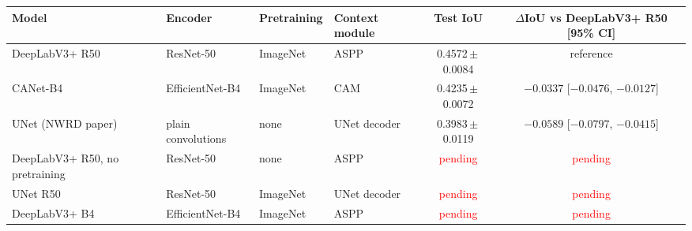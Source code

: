\begin{tabular}{llllcc}
\toprule
Model & Encoder & Pretraining & Context module & Test IoU & $\Delta$IoU vs DeepLabV3+ R50 [95\% CI] \\
\midrule
DeepLabV3+ R50 & ResNet-50 & ImageNet & ASPP & 0.4572\,$\pm$\,0.0084 & reference \\
CANet-B4 & EfficientNet-B4 & ImageNet & CAM & 0.4235\,$\pm$\,0.0072 & $-0.0337$ [$-0.0476$, $-0.0127$] \\
UNet (NWRD paper) & plain convolutions & none & UNet decoder & 0.3983\,$\pm$\,0.0119 & $-0.0589$ [$-0.0797$, $-0.0415$] \\
DeepLabV3+ R50, no pretraining & ResNet-50 & none & ASPP & \textcolor{red}{pending} & \textcolor{red}{pending} \\
UNet R50 & ResNet-50 & ImageNet & UNet decoder & \textcolor{red}{pending} & \textcolor{red}{pending} \\
DeepLabV3+ B4 & EfficientNet-B4 & ImageNet & ASPP & \textcolor{red}{pending} & \textcolor{red}{pending} \\
\bottomrule
\end{tabular}
